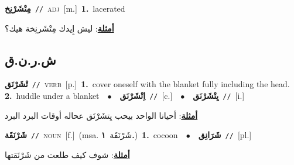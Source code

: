 \documentclass[10pt,a4paper,twoside]{article} %
\begin{document}
\begin{multicols}{2}
{\setlength\topsep{0pt}\textbf{\foreignlanguage{arabic}{مِتْشَرْنِخ}}\ {\color{gray}\texttt{//}\color{black}}\ \textsc{adj}\ [m.]\ \textbf{1.}~lacerated\  \begin{flushright}\color{gray}\foreignlanguage{arabic}{\textbf{\underline{\foreignlanguage{arabic}{أمثلة}}}: ليش إِيدك مِتْشَرنِخة هيك؟}\end{flushright}\color{black}} \vspace{2mm}

\vspace{-3mm}
\subsection*{\color{blue}\foreignlanguage{arabic}{ش.ر.ن.ق}\color{blue}{}} 

{\setlength\topsep{0pt}\textbf{\foreignlanguage{arabic}{تْشَرْنَق}}\ {\color{gray}\texttt{//}\color{black}}\ \textsc{verb}\ [p.]\ \textbf{1.}~cover oneself with the blanket fully including the head.  \textbf{2.}~huddle under a blanket\ \ $\bullet$\ \ \setlength\topsep{0pt}\textbf{\foreignlanguage{arabic}{اِتْشَرْنَق}}\ {\color{gray}\texttt{//}\color{black}}\ [c.]\ \ $\bullet$\ \ \setlength\topsep{0pt}\textbf{\foreignlanguage{arabic}{يِتْشَرْنَق}}\ {\color{gray}\texttt{//}\color{black}}\ [i.]\  \begin{flushright}\color{gray}\foreignlanguage{arabic}{\textbf{\underline{\foreignlanguage{arabic}{أمثلة}}}: أحيانا الواحد بيحب يِتشَرْنَق عحاله أوقات البرد البرد}\end{flushright}\color{black}} \vspace{2mm}

{\setlength\topsep{0pt}\textbf{\foreignlanguage{arabic}{شَرْنَقَة}}\ {\color{gray}\texttt{//}\color{black}}\ \textsc{noun}\ [f.]\ \color{gray}(msa. \foreignlanguage{arabic}{شَرْنَقَة}~\foreignlanguage{arabic}{\textbf{١.}})\color{black}\ \textbf{1.}~cocoon\ \ $\bullet$\ \ \setlength\topsep{0pt}\textbf{\foreignlanguage{arabic}{شَرَانِق}}\ {\color{gray}\texttt{//}\color{black}}\ [pl.]\  \begin{flushright}\color{gray}\foreignlanguage{arabic}{\textbf{\underline{\foreignlanguage{arabic}{أمثلة}}}: شوف كيف طلعت من شَرْنَقتها}\end{flushright}\color{black}} \vspace{2mm}


\end{multicols}
\end{document}
